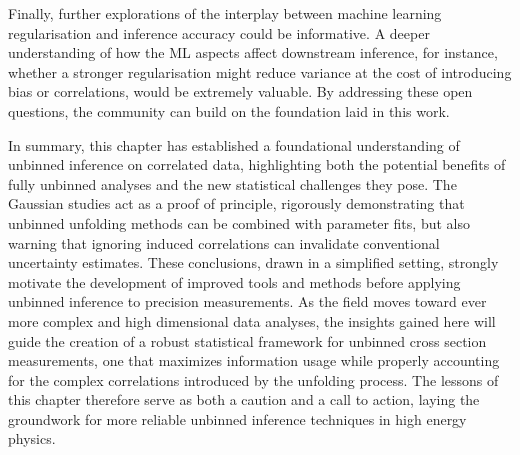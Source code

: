    Finally, further explorations of the interplay between machine learning regularisation and inference accuracy could be informative.
    A deeper understanding of how the ML aspects affect downstream inference, for instance, whether a stronger regularisation might reduce variance at the cost of introducing bias or correlations, would be extremely valuable.
    By addressing these open questions, the community can build on the foundation laid in this work.

    In summary, this chapter has established a foundational understanding of unbinned inference on correlated data, highlighting both the potential benefits of fully unbinned analyses and the new statistical challenges they pose.
    The Gaussian studies act as a proof of principle, rigorously demonstrating that unbinned unfolding methods can be combined with parameter fits, but also warning that ignoring induced correlations can invalidate conventional uncertainty estimates.
    These conclusions, drawn in a simplified setting, strongly motivate the development of improved tools and methods before applying unbinned inference to precision measurements.
    As the field moves toward ever more complex and high dimensional data analyses, the insights gained here will guide the creation of a robust statistical framework for unbinned cross section measurements, one that maximizes information usage while properly accounting for the complex correlations introduced by the unfolding process.
    The lessons of this chapter therefore serve as both a caution and a call to action, laying the groundwork for more reliable unbinned inference techniques in high energy physics.